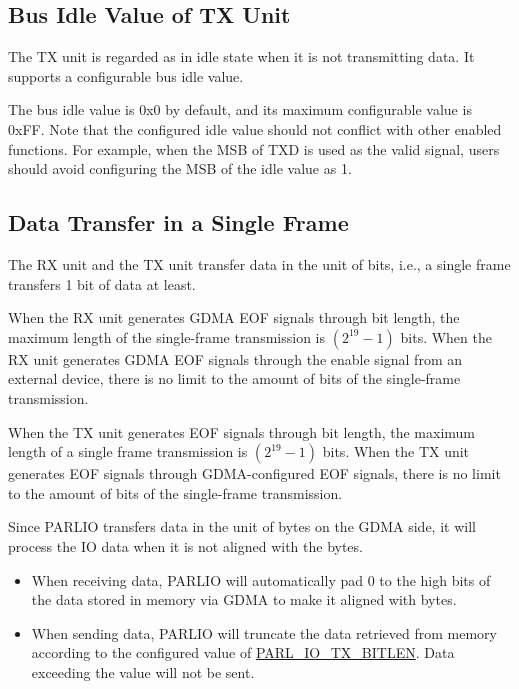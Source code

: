 \documentclass[main\_\_EN.tex]{subfiles}
\begin{document}
\subsection{Bus Idle Value of TX Unit}\label{subsec:parlio-tx-bus-idle-value}

The TX unit is regarded as in idle state when it is not transmitting data. It supports a configurable bus idle value.

The bus idle value is 0x0 by default, and its maximum configurable value is 0xFF. Note that the configured idle value should not conflict with other enabled functions. For example, when the MSB of TXD is used as the valid signal, users should avoid configuring the MSB of the idle value as 1.

\subsection{Data Transfer in a Single Frame}

The RX unit and the TX unit transfer data in the unit of bits, i.e., a single frame transfers 1 bit of data at least.

When the RX unit generates GDMA EOF signals through bit length, the maximum length of the single-frame transmission is \begin{math} (2^{19}-1) \end{math} bits. When the RX unit generates GDMA EOF signals through the enable signal from an external device, there is no limit to the amount of bits of the single-frame transmission.

When the TX unit generates EOF signals through bit length, the maximum length of a single frame transmission is \begin{math} (2^{19}-1) \end{math} bits. When the TX unit generates EOF signals through GDMA-configured EOF signals, there is no limit to the amount of bits of the single-frame transmission.

Since PARLIO transfers data in the unit of bytes on the GDMA side, it will process the IO data when it is not aligned with the bytes.

\begin{itemize}
    \item When receiving data, PARLIO will automatically pad 0 to the high bits of the data stored in memory via GDMA to make it aligned with bytes.
    \item When sending data, PARLIO will truncate the data retrieved from memory according to the configured value of \hyperref[fielddesc:PARLIOTXBITLEN]{PARL\_IO\_TX\_BITLEN}. Data exceeding the value will not be sent.
\end{itemize}
\end{document}
